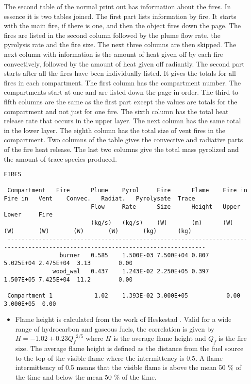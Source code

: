 The second table of the normal print out has information about the fires.  In essence it is two tables joined.  The first part lists information by fire.  It starts with the main fire, if there is one, and then the object fires down the page.  The fires are listed in the second column followed by the plume flow rate, the pyrolysis rate and the fire size.  The next three columns are then skipped.  The next column with information is the amount of heat given off by each fire convectively, followed by the amount of heat given off radiantly.  The second part starts after all the fires have been individually listed.  It gives the totals for all fires in each compartment.  The first column has the compartment number.  The compartments start at one and are listed down the page in order.  The third to fifth columns are the same as the first part except the values are totals for the compartment and not just for one fire.  The sixth column has the total heat release rate that occurs in the upper layer.  The next column has the same total in the lower layer.  The eighth column has the total size of vent fires in the compartment.  Two columns of the table gives the convective and radiative parts of the fire heat release. The last two columns give the total mass pyrolized and the amount of trace species produced.

\begin{lstlisting}[basicstyle=\tiny]
 FIRES

 Compartment   Fire      Plume    Pyrol     Fire      Flame    Fire in  Fire in   Vent    Convec.   Radiat.   Pyrolysate  Trace
                         Flow     Rate      Size      Height   Upper    Lower     Fire
                         (kg/s)   (kg/s)    (W)       (m)      (W)      (W)       (W)       (W)       (W)       (kg)      (kg)
 -------------------------------------------------------------------------------------------------------------------------------
                burner   0.585    1.500E-03 7.500E+04 0.807                               5.025E+04 2.475E+04  3.13        0.00
              wood_wal   0.437    1.243E-02 2.250E+05 0.397                               1.507E+05 7.425E+04  11.2        0.00

 Compartment 1            1.02    1.393E-02 3.000E+05           0.00    3.000E+05  0.00    
\end{lstlisting}

\begin{itemize}
\item Flame height is calculated from the work of Heskestad \cite{Heskestad:2002}. Valid for a wide range of hydrocarbon and gaseous fuels, the correlation is given by $H = -1.02 + 0.23{Q_f}^{2/5}$ where $H$ is the average flame height and $Q_f$ is the fire size. The average flame height is defined as the distance from the fuel source to the top of the visible flame where the intermittency is 0.5.  A flame intermittency of 0.5 means that the visible flame is above the mean 50 \% of the time and below the mean 50 \% of the time.
\end{itemize}

